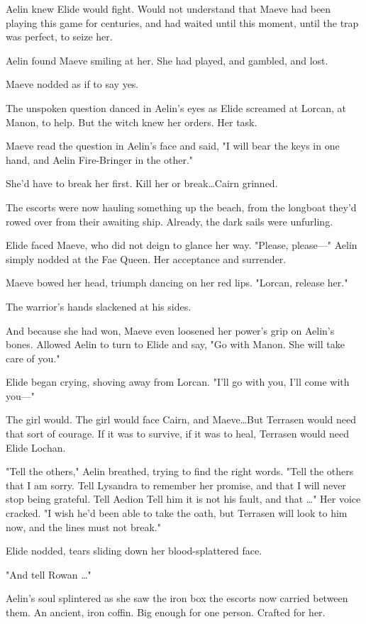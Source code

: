 Aelin knew Elide would fight.
Would not understand that Maeve had been playing this game for centuries, and had waited until this moment, until the trap was perfect, to seize her.

Aelin found Maeve smiling at her.
She had played, and gambled, and lost.

Maeve nodded as if to say yes.

The unspoken question danced in Aelin's eyes as Elide screamed at Lorcan, at Manon, to help.
But the witch knew her orders.
Her task.

Maeve read the question in Aelin's face and said, "I will bear the keys in one hand, and Aelin Fire-Bringer in the other."

She'd have to break her first.
Kill her or break\ldots Cairn grinned.

The escorts were now hauling something up the beach, from the longboat they'd rowed over from their awaiting ship.
Already, the dark sails were unfurling.

Elide faced Maeve, who did not deign to glance her way.
"Please, please---" Aelin simply nodded at the Fae Queen.
Her acceptance and surrender.

Maeve bowed her head, triumph dancing on her red lips.
"Lorcan, release her."

The warrior's hands slackened at his sides.

And because she had won, Maeve even loosened her power's grip on Aelin's bones.
Allowed Aelin to turn to Elide and say, "Go with Manon.
She will take care of you."

Elide began crying, shoving away from Lorcan.
"I'll go with you, I'll come with you---"

The girl would.
The girl would face Cairn, and Maeve\ldots But Terrasen would need that sort of courage.
If it was to survive, if it was to heal, Terrasen would need Elide Lochan.

"Tell the others," Aelin breathed, trying to find the right words.
"Tell the others that I am sorry.
Tell Lysandra to remember her promise, and that I will never stop being grateful.
Tell Aedion 
Tell him it is not his fault, and that \ldots" Her voice cracked.
"I wish he'd been able to take the oath, but Terrasen will look to him now, and the lines must not break."

Elide nodded, tears sliding down her blood-splattered face.

"And tell Rowan \ldots"

Aelin's soul splintered as she saw the iron box the escorts now carried between them.
An ancient, iron coffin.
Big enough for one person.
Crafted for her.

